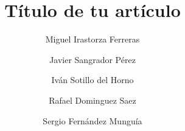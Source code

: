 \documentclass[sigconf]{acmart}
\title{Título de tu artículo}
\author{Miguel Irastorza Ferreras}
\author{Javier Sangrador Pérez}
\author{Iván Sotillo del Horno}
\author{Rafael Dominguez Saez}
\author{Sergio Fernández Munguía}
\begin{document}
\begin{abstract}
    
\end{abstract}
\maketitle










\end{document}
